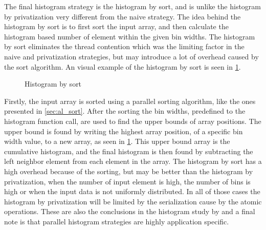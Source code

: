 The final histogram strategy is the histogram by sort, and is unlike the histogram by privatization very different from the naive strategy. The idea behind the histogram by sort is to first sort the input array, and then calculate the histogram based number of element within the given bin widths. The histogram by sort eliminates the thread contention which was the limiting factor in the naive and privatization strategies, but may introduce a lot of overhead caused by the sort algorithm. An visual example of the histogram by sort is seen in \cref{fig:hist_sort}. 

\begin{figure}[ht]
	\centering
	\caption{Histogram by sort}
	\label{fig:hist_sort}
\end{figure} 

Firstly, the input array is sorted using a parallel sorting algorithm, like the ones presented in \cref{sec:al_sort}. After the sorting the bin widths, predefined to the histogram function call, are used to find the upper bounds of array positions. The upper bound is found by writing the highest array position, of a specific bin width value, to a new array, as seen in \cref{fig:hist_sort}. This upper bound array is the cumulative histogram, and the final histogram is then found by subtracting the left neighbor element from each element in the array. 
The histogram by sort has a high overhead because of the sorting, but may be better than the histogram by privatization, when the number of input element is high, the number of bins is high or when the input data is not uniformly distributed. In all of those cases the histogram by privatization will be limited by the serialization cause by the atomic operations. These are also the conclusions in the histogram study by \cite{MilicHistogram} and a final note is that parallel histogram strategies are highly application specific.